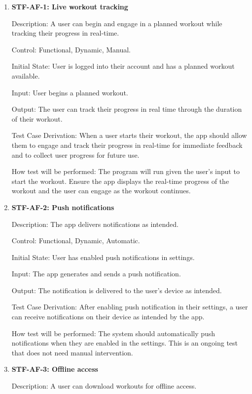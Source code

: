 \documentclass[12pt, titlepage]{article}
\begin{document}
\begin{enumerate}

\item{\textbf{STF-AF-1: Live workout tracking}\\}

Description: A user can begin and engage in a planned workout while tracking their progress in real-time.
	
Control: Functional, Dynamic, Manual.

Initial State: User is logged into their account and has a planned workout available.

Input: User begins a planned workout.

Output: The user can track their progress in real time through the duration of their workout.

Test Case Derivation: When a user starts their workout, the app should allow them to engage and track their progress in real-time for immediate feedback and to collect user progress for future use. 

How test will be performed: The program will run given the user’s input to start the workout. Ensure the app displays the real-time progress of the workout and the user can engage as the workout continues.

\item{\textbf{STF-AF-2: Push notifications}\\}

Description: The app delivers notifications as intended.
	
Control: Functional, Dynamic, Automatic.

Initial State: User has enabled push notifications in settings.

Input: The app generates and sends a push notification.

Output: The notification is delivered to the user’s device as intended.

Test Case Derivation: After enabling push notification in their settings, a user can receive notifications on their device as intended by the app.
	
How test will be performed: The system should automatically push notifications when they are enabled in the settings. This is an ongoing test that does not need manual intervention.

\item{\textbf{STF-AF-3: Offline access}\\}

Description: A user can download workouts for offline access.
	

\end{enumerate}
\end{document}
